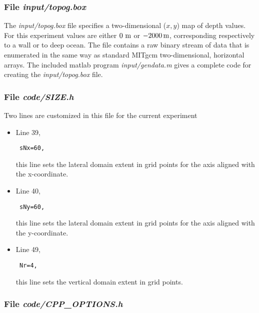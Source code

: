 \subsubsection{File {\it input/topog.box}}
\label{www:tutorials}


The {\it input/topog.box} file specifies a two-dimensional ($x,y$) 
map of depth values. For this experiment values are either
$0~{\rm m}$ or $-2000\,{\rm m}$, corresponding respectively to a wall or to deep
ocean. The file contains a raw binary stream of data that is enumerated
in the same way as standard MITgcm two-dimensional, horizontal arrays.
The included matlab program {\it input/gendata.m} gives a complete
code for creating the {\it input/topog.box} file.

\subsubsection{File {\it code/SIZE.h}}
\label{www:tutorials}

Two lines are customized in this file for the current experiment

\begin{itemize}

\item Line 39, 
\begin{verbatim} sNx=60, \end{verbatim} this line sets
the lateral domain extent in grid points for the
axis aligned with the x-coordinate.

\item Line 40, 
\begin{verbatim} sNy=60, \end{verbatim} this line sets
the lateral domain extent in grid points for the
axis aligned with the y-coordinate.

\item Line 49, 
\begin{verbatim} Nr=4,   \end{verbatim} this line sets
the vertical domain extent in grid points.

\end{itemize}

\begin{small}

\end{small}

\subsubsection{File {\it code/CPP\_OPTIONS.h}}
\label{www:tutorials}

